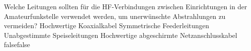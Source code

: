     {Welche Leitungen sollten für die HF-Verbindungen zwischen Einrichtungen in der Amateurfunkstelle verwendet werden, um unerwünschte Abstrahlungen zu vermeiden?}
    {Hochwertige Koaxialkabel}
    {Symmetrische Feederleitungen}
    {Unabgestimmte Speiseleitungen}
    {Hochwertige abgeschirmte Netzanschlusskabel}
    {false}{false}
